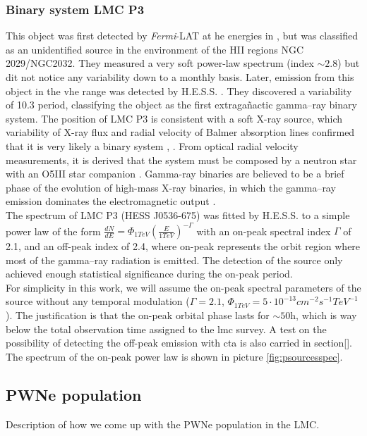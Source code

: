 \documentclass{article}
\begin{document}
    \subsubsection{Binary system LMC P3}
    This object was first detected by \textit{Fermi}-LAT at \gls{he} energies in \cite{2016LMCFermiLAT}, but was classified as an unidentified source in the environment of the HII regions NGC 2029/NGC2032. They measured a very soft power-law spectrum (index $\sim 2.8$) but dit not notice any variability down to a monthly basis.
    Later, emission from this object in the \gls{vhe} range was detected by H.E.S.S. \cite{2017HESSLMCP3}. They discovered a variability of 10.3 period, classifying the object as the first extragañactic gamma--ray binary system. The position of LMC P3 is consistent with a soft X-ray source, which variability of X-ray flux and radial velocity of Balmer absorption lines confirmed that it is very likely a binary system \cite{1981softXraysLMC}, \cite{2012xraybinaryP3}. From optical radial velocity measurements, it is derived that the system must be composed by a neutron star with an O5III star companion \cite{2016P3binary}. Gamma-ray binaries are believed to be a brief phase of the evolution of high-mass X-ray binaries, in which the gamma--ray emission dominates the electromagnetic output \cite{1989binaries}.\\
    The spectrum of LMC P3 (HESS J0536-675) was fitted by H.E.S.S. to a simple power law of the form $\frac{dN}{dE} = \Phi_{1TeV}\left( \frac{E}{1TeV}\right)^{-\Gamma}$ with an on-peak spectral index $\Gamma$ of 2.1, and an off-peak index of 2.4, where on-peak represents the orbit region where most of the gamma--ray radiation is emitted. The detection of the source only achieved enough statistical significance during the on-peak period.\\
    For simplicity in this work, we will assume the on-peak spectral parameters of the source without any temporal modulation ($\Gamma=2.1$, $\Phi_{1TeV} = 5 \cdot 10^{-13}cm^{-2}s^{-1}TeV^{-1}$). The justification is that the on-peak orbital phase lasts for $\sim 50$h, which is way below the total observation time assigned to the \gls{lmc} survey. A test on the possibility of detecting the off-peak emission with \gls{cta} is also carried in section[]. The spectrum of the on-peak power law is shown in picture \ref{fig:psourcesspec}.
     
    \subsection{PWNe population} \label{sec:pwnepop}
    Description of how we come up with the PWNe population in the LMC.
\end{document}
